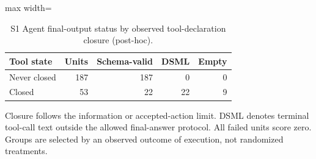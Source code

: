 \begin{table}[t]
\centering
\caption{S1 Agent final-output status by observed tool-declaration closure (post-hoc).}\label{tab:completion}
\small
\begin{adjustbox}{max width=\columnwidth}\begin{tabular}{lrrrr}
\toprule
Tool state & Units & Schema-valid & DSML & Empty \\
\midrule
Never closed & 187 & 187 & 0 & 0 \\
Closed & 53 & 22 & 22 & 9 \\
\bottomrule
\end{tabular}\end{adjustbox}
\par\vspace{3pt}\begin{minipage}{\columnwidth}\footnotesize Closure follows the information or accepted-action limit. DSML denotes terminal tool-call text outside the allowed final-answer protocol. All failed units score zero. Groups are selected by an observed outcome of execution, not randomized treatments.\end{minipage}
\end{table}
